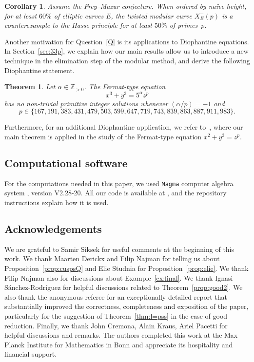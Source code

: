 \documentclass[12pt]{amsart}
\numberwithin{equation}{section}
\newtheorem{theorem}[equation]{Theorem}
\newtheorem{corollary}[equation]{Corollary}
\theoremstyle{definition}
\newcommand{\Z}{\mathbb{Z}}
\newcommand{\Xp}{X_E^{-}(p)}
\begin{document}
\begin{corollary}\label{cor:bound} 
Assume the Frey--Mazur conjecture.
When ordered by na\"ive height, 
for at least $60\%$ of elliptic curves $E$, the twisted modular curve $\Xp$ is a counterexample to the Hasse principle for at least $50\%$ of primes~$p$.
\end{corollary}

Another motivation for Question~\ref{Q} is its applications to Diophantine equations.
In Section~\ref{sec:33p}, we explain how our main results allow us to introduce a new technique in the elimination step of the modular method, and derive the following Diophantine statement.
\begin{theorem}\label{thm:33p}
Let $\alpha \in \Z_{>0}$. The Fermat-type equation
$$x^3+y^3=5^\alpha z^p$$
has no non-trivial primitive integer solutions whenever $(\alpha / p ) = -1$ and
    \[
    p\in \{167, 191, 383, 431, 479, 503, 599, 647, 719, 743, 839, 863, 887, 911, 983\}.
    \]

\end{theorem}
\vspace{-2mm}
Furthermore, for an additional Diophantine application, we refer to~\cite{FMS}, where our main theorem is applied in the study of the Fermat-type equation $x^2 + y^3 = z^p$.

\subsection{Computational software}
For the computations needed in this paper, we used {\tt Magma} computer algebra system \cite{magma}, version V2.28-20.
All our
code is available at \cite{git}, and the repository instructions explain how it is used.
\subsection{Acknowledgements} 
We are grateful to Samir Siksek for useful comments at
the beginning of this work. We thank Maarten Derickx and Filip Najman for telling us about Proposition~\ref{prop:cuspsQ} and Elie Studnia for Proposition~\ref{prop:elie}. We thank Filip Najman also for discussions about Example~\ref{ex:final}. We thank Ignasi S\'anchez-Rodr\'iguez for helpful discussions related to Theorem~\ref{prop:good2}. We also thank the anonymous referee 
for an exceptionally detailed report that substantially improved the correctness, completeness and exposition of the paper, particularly for the suggestion of Theorem~\ref{thm:l=pss} in the case of good reduction.
Finally, we thank John Cremona, Alain Kraus, Ariel Pacetti for helpful discussions and remarks. 
The authors completed this work at the Max Planck Institute for Mathematics in Bonn and appreciate its hospitality and financial support.
\vspace{-3mm}
\end{document}
